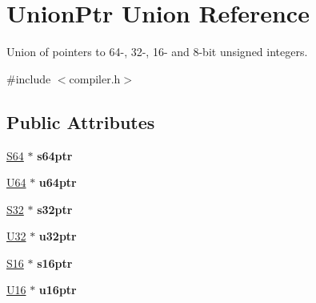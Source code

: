 \hypertarget{union_union_ptr}{\section{Union\-Ptr Union Reference}
\label{union_union_ptr}
}


Union of pointers to 64-\/, 32-\/, 16-\/ and 8-\/bit unsigned integers.  




{\ttfamily \#include $<$compiler.\-h$>$}

\subsection*{Public Attributes}
\begin{DoxyCompactItemize}
\item 
\hypertarget{union_union_ptr_a63f71a612f64662218512e29af1677c0}{\hyperlink{group__group__xmega__utils_ga1d293e5c494dd6826239b02f5fe98e7f}{S64} $\ast$ {\bfseries s64ptr}}\label{union_union_ptr_a63f71a612f64662218512e29af1677c0}

\item 
\hypertarget{union_union_ptr_acf1a3f495e9659fe4577751425b6ce99}{\hyperlink{group__group__xmega__utils_ga25809e0734a149248fcf5831efa4e33d}{U64} $\ast$ {\bfseries u64ptr}}\label{union_union_ptr_acf1a3f495e9659fe4577751425b6ce99}

\item 
\hypertarget{union_union_ptr_a57b84ed1151cc81432197efd46a88fdb}{\hyperlink{group__group__xmega__utils_ga39c786017723555afb9e8b85accec0de}{S32} $\ast$ {\bfseries s32ptr}}\label{union_union_ptr_a57b84ed1151cc81432197efd46a88fdb}

\item 
\hypertarget{union_union_ptr_a2bf916009db91dc0bb39f0cbbecf77fd}{\hyperlink{group__group__xmega__utils_ga696390429f2f3b644bde8d0322a24124}{U32} $\ast$ {\bfseries u32ptr}}\label{union_union_ptr_a2bf916009db91dc0bb39f0cbbecf77fd}

\item 
\hypertarget{union_union_ptr_a593e40c713f698413d1e898f403e9bd2}{\hyperlink{group__group__xmega__utils_ga6d241ad21a823c90d4835380787db5d4}{S16} $\ast$ {\bfseries s16ptr}}\label{union_union_ptr_a593e40c713f698413d1e898f403e9bd2}

\item 
\hypertarget{union_union_ptr_a0f6f6d7b3464a7c8aca80a1722fc3347}{\hyperlink{group__group__xmega__utils_ga0a0a322d5fa4a546d293a77ba8b4a71f}{U16} $\ast$ {\bfseries u16ptr}}\label{union_union_ptr_a0f6f6d7b3464a7c8aca80a1722fc3347}


\end{DoxyCompactItemize}
